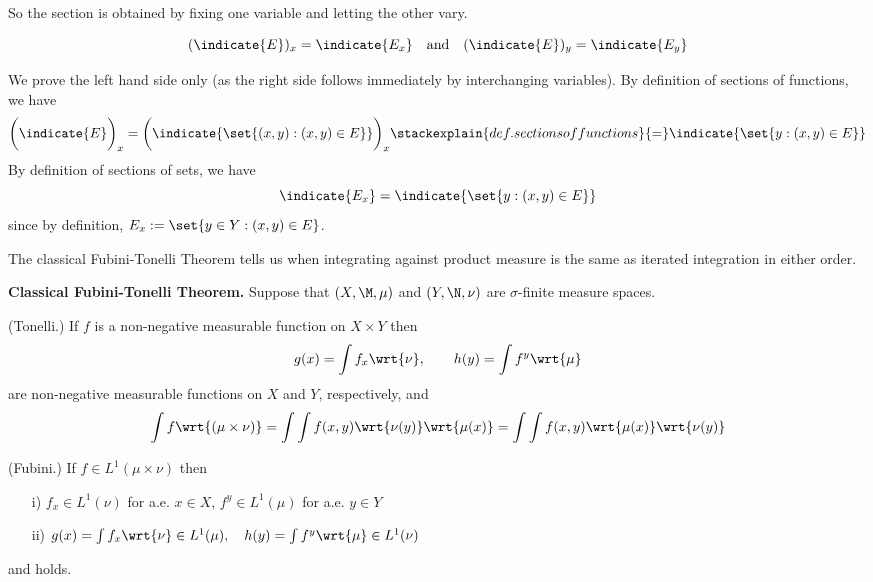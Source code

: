 \documentclass{article} %
\begin{document}
So the section is obtained by fixing one variable and letting the other vary. 

\begin{example}
\[ (\indicate{E})_x =  \indicate{{E_x}} \quad \text{and} \quad (\indicate{E})_y =  \indicate{{E_y}}  \]

{\tiny We prove the left hand side only (as the right side follows immediately by interchanging variables). By definition of sections of functions, we have
\[\bigg(\indicate{E}\bigg)_x = \bigg(\indicate{ \set{(x,y) : (x,y) \in E}}\bigg)_x \stackexplain{def. sections of functions}{=} \indicate{\set{y: (x,y) \in E}}\] 
By definition of sections of sets, we have
\[ \indicate{{E_x}} = \indicate{\set{y: (x,y) \in E}} \]
since by definition, $E_x := \set{y \in Y : (x,y) \in E}$. 
}
\end{example}


The classical Fubini-Tonelli Theorem tells us when integrating against product measure is the same as iterated integration in either order. 

\begin{theorem}\textbf{Classical Fubini-Tonelli Theorem.}   Suppose that $(X,\M,\mu)$ and $(Y, \N, \nu)$ are $\sigma$-finite measure spaces.  
\begin{alphabate}
\item (Tonelli.) If $f$ is a non-negative measurable function on $X \times Y$ then
\[ g(x) = \int f_x \wrt{\nu}, \quad \quad h(y) = \int f^y \wrt{\mu} \]
are non-negative measurable functions on $X$ and $Y$, respectively, and 
\begin{align}
\int f \wrt{(\mu \times \nu)} = \int \int f(x,y) \wrt{\nu(y)}   \wrt{\mu(x)}  = \int \int f(x,y) \wrt{\mu(x)}  \wrt{\nu(y)}   
\label{eqn:classical_fubini_tonelli_equation}
\end{align}
\item (Fubini.) If $f \in L^1(\mu \times \nu)$ then 
	\begin{enumerate}
		\item[i)] $f_x \in L^1(\nu)$ for a.e. $x \in X$, \quad $f^y \in L^1(\mu)$ for a.e. $y \in Y$
		\item[ii)] $g(x) = \int f_x \wrt{\nu} \in L^1(\mu),  \quad h(y) = \int f^y \wrt{\mu} \in L^1(\nu)$
	\end{enumerate}
and  holds.
\end{alphabate}	
\label{thm:classical_fubini_tonelli}
\end{theorem}
\end{document}
